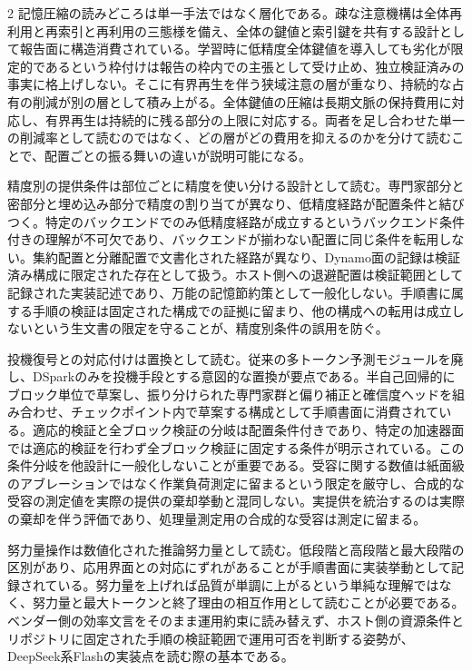 \documentclass[lualatex,a4paper,10pt]{jlreq}
\begin{document}
\begin{multicols}{2}
記憶圧縮の読みどころは単一手法ではなく層化である。疎な注意機構は全体再利用と再索引と再利用の三態様を備え、全体の鍵値と索引鍵を共有する設計として報告面に構造消費されている\autocite{v41report}。学習時に低精度全体鍵値を導入しても劣化が限定的であるという枠付けは報告の枠内での主張として受け止め、独立検証済みの事実に格上げしない。そこに有界再生を伴う狭域注意の層が重なり、持続的な占有の削減が別の層として積み上がる\autocite{v41report}\autocite{v41card}。全体鍵値の圧縮は長期文脈の保持費用に対応し、有界再生は持続的に残る部分の上限に対応する。両者を足し合わせた単一の削減率として読むのではなく、どの層がどの費用を抑えるのかを分けて読むことで、配置ごとの振る舞いの違いが説明可能になる。

精度別の提供条件は部位ごとに精度を使い分ける設計として読む。専門家部分と密部分と埋め込み部分で精度の割り当てが異なり、低精度経路が配置条件と結びつく\autocite{v41card}\autocite{vllmrecipe}\autocite{vllmv41}。特定のバックエンドでのみ低精度経路が成立するというバックエンド条件付きの理解が不可欠であり、バックエンドが揃わない配置に同じ条件を転用しない。集約配置と分離配置で文書化された経路が異なり、Dynamo面の記録は検証済み構成に限定された存在として扱う\autocite{dynamo}。ホスト側への退避配置は検証範囲として記録された実装記述であり、万能の記憶節約策として一般化しない。手順書に属する手順の検証は固定された構成での証拠に留まり、他の構成への転用は成立しないという生文書の限定を守ることが、精度別条件の誤用を防ぐ。

投機復号との対応付けは置換として読む。従来の多トークン予測モジュールを廃し、DSparkのみを投機手段とする意図的な置換が要点である\autocite{dspark}\autocite{vllmrecipe}。半自己回帰的にブロック単位で草案し、振り分けられた専門家群と偏り補正と確信度ヘッドを組み合わせ、チェックポイント内で草案する構成として手順書面に消費されている\autocite{dspark}。適応的検証と全ブロック検証の分岐は配置条件付きであり、特定の加速器面では適応的検証を行わず全ブロック検証に固定する条件が明示されている。この条件分岐を他設計に一般化しないことが重要である。受容に関する数値は紙面級のアブレーションではなく作業負荷測定に留まるという限定を厳守し、合成的な受容の測定値を実際の提供の棄却挙動と混同しない。実提供を統治するのは実際の棄却を伴う評価であり、処理量測定用の合成的な受容は測定に留まる\autocite{vllmrecipe}\autocite{dspark}。

努力量操作は数値化された推論努力量として読む。低段階と高段階と最大段階の区別があり、応用界面との対応にずれがあることが手順書面に実装挙動として記録されている\autocite{vllmrecipe}。努力量を上げれば品質が単調に上がるという単純な理解ではなく、努力量と最大トークンと終了理由の相互作用として読むことが必要である。ベンダー側の効率文言をそのまま運用約束に読み替えず、ホスト側の資源条件とリポジトリに固定された手順の検証範囲で運用可否を判断する姿勢が、DeepSeek系Flashの実装点を読む際の基本である。


\end{multicols}
\end{document}

